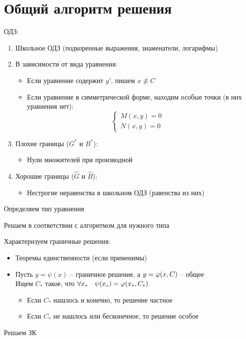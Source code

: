 \chapter{Общий алгоритм решения}

\begin{algo}
	\item ОДЗ:
    \begin{enumerate}
    	\item Школьное ОДЗ (подкоренные выражения, знаменатели, логарифмы)
        \item В зависимости от вида уравнения:
        \begin{itemize}
        	\item Если уравнение содержит $ y' $, пишем $ x \not\equiv C $
            \item Если уравнение в симметрической форме, находим особые точки (в них уравнения нет):
            $$
            \begin{cases}
            	M(x, y) = 0 \\
                N(x, y) = 0
            \end{cases} $$
        \end{itemize}
        \item Плохие границы ($ G^* $ и $ B^* $):
        \begin{itemize}
        	\item Нули множителей при производной
        \end{itemize}
        \item Хорошие границы ($ \hat{G} $ и $ \hat{B} $):
        \begin{itemize}
        	\item Нестрогие неравенства в школьном ОДЗ (равенства из них)
        \end{itemize}
    \end{enumerate}
    \item Определяем тип уравнения
    \item Решаем в соответствии с алгоритмом для нужного типа
    \item Характеризуем граничные решения:
    \begin{itemize}
    	\item Теоремы единственности (если применимы)
        \item Пусть $ y = \psi(x) $ -- граничное решение, а $ y = \varphi(x, C) $ -- общее \\
        Ищем $ C_* $ такое, что $ \forall x_* \quad \psi(x_*) = \varphi(x_*, C_*) $
        \begin{itemize}
        	\item Если $ C_* $ нашлось и конечно, то решение частное
            \item Если $ C_* $ не нашлось или бесконечное, то решение особое
        \end{itemize}
    \end{itemize}
    \item Решаем ЗК
\end{algo}

